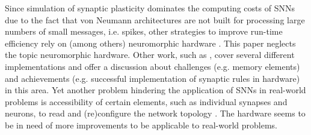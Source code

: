 Since simulation of synaptic plasticity dominates the computing costs of \acp{SNN} due to the fact that von Neumann architectures are not built 
for processing large numbers of small messages, i.e. spikes, 
other strategies to improve run-time efficiency rely on (among others) neuromorphic hardware \cite{simulation_STDP}.
This paper neglects the topic neuromorphic hardware.
Other work, such as \cite{Synaptic_plasticity}, 
cover several different implementations and offer a discussion about challenges (e.g. memory elements) and achievements 
(e.g. successful implementation of synaptic rules in hardware) in this area.
Yet another problem hindering the application of \acp{SNN} in real-world problems is accessibility of certain elements, such as individual synapses and neurons, 
to read and (re)configure the network topology \cite{hardware_STDP}.
The hardware seems to be in need of more improvements to be applicable to real-world problems.